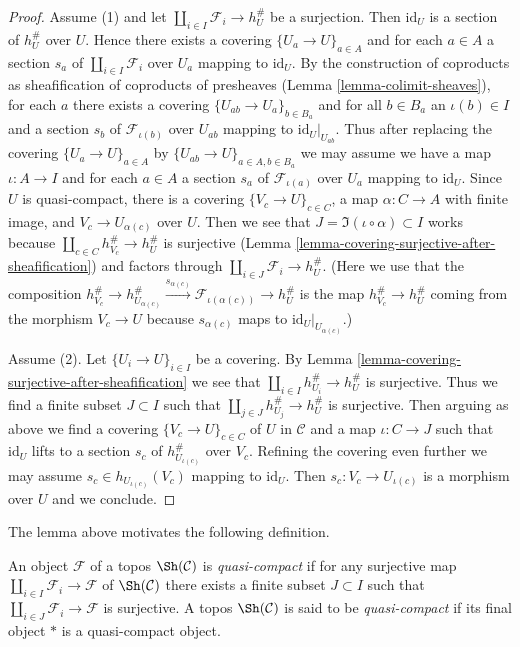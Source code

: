 \begin{proof}
Assume (1) and let $\coprod_{i \in I} \mathcal{F}_i \to h_U^\#$
be a surjection. Then $\text{id}_U$ is a section of
$h_U^\#$ over $U$. Hence there exists a covering
$\{U_a \to U\}_{a \in A}$ and for each $a \in A$
a section $s_a$ of $\coprod_{i \in I} \mathcal{F}_i$
over $U_a$ mapping to $\text{id}_U$. By the construction of coproducts as
sheafification of coproducts of presheaves
(Lemma \ref{lemma-colimit-sheaves}), for each $a$
there exists a covering $\{U_{ab} \to U_a\}_{b \in B_a}$ and
for all $b \in B_a$ an $\iota(b) \in I$ and a section
$s_{b}$ of $\mathcal{F}_{\iota(b)}$ over $U_{ab}$
mapping to $\text{id}_U|_{U_{ab}}$. Thus after replacing
the covering $\{U_a \to U\}_{a \in A}$ by
$\{U_{ab} \to U\}_{a \in A, b \in B_a}$
we may assume we have a map $\iota : A \to I$
and for each $a \in A$ a section $s_a$ of $\mathcal{F}_{\iota(a)}$
over $U_a$ mapping to $\text{id}_U$.
Since $U$ is quasi-compact, there is a covering
$\{V_c \to U\}_{c \in C}$, a map $\alpha : C \to A$
with finite image, and $V_c \to U_{\alpha(c)}$ over $U$.
Then we see that $J = \Im(\iota \circ \alpha) \subset I$ works
because $\coprod_{c \in C} h_{V_c}^\# \to h_U^\#$ is surjective
(Lemma \ref{lemma-covering-surjective-after-sheafification})
and factors through $\coprod_{i \in J} \mathcal{F}_i \to h_U^\#$.
(Here we use that the composition
$h_{V_c}^\# \to h_{U_{\alpha(c)}}^\#
\xrightarrow{s_{\alpha(c)}} \mathcal{F}_{\iota(\alpha(c))} \to h_U^\#$
is the map $h_{V_c}^\# \to h_U^\#$ coming from the morphism
$V_c \to U$ because $s_{\alpha(c)}$ maps to $\text{id}_U|_{U_{\alpha(c)}}$.)

\medskip\noindent
Assume (2). Let $\{U_i \to U\}_{i \in I}$ be a covering.
By Lemma \ref{lemma-covering-surjective-after-sheafification}
we see that $\coprod_{i \in I} h_{U_i}^\# \to h_U^\#$ is surjective.
Thus we find a finite subset $J \subset I$ such that
$\coprod_{j \in J} h_{U_j}^\# \to h_U^\#$ is surjective.
Then arguing as above we find a covering
$\{V_c \to U\}_{c \in C}$ of $U$ in $\mathcal{C}$
and a map $\iota : C \to J$
such that $\text{id}_U$ lifts to a section
$s_c$ of $h_{U_{\iota(c)}}^\#$ over $V_c$.
Refining the covering even further we may assume
$s_c \in h_{U_{\iota(c)}}(V_c)$ mapping to $\text{id}_U$.
Then $s_c : V_c \to U_{\iota(c)}$ is a morphism over $U$
and we conclude.
\end{proof}

\noindent
The lemma above motivates the following definition.

\begin{definition}
\label{definition-quasi-compact-topos}
An object $\mathcal{F}$ of a topos $\Sh(\mathcal{C})$ is {\it quasi-compact}
if for any surjective map $\coprod_{i \in I} \mathcal{F}_i \to \mathcal{F}$
of $\Sh(\mathcal{C})$ there exists a finite subset $J \subset I$ such
that $\coprod_{i \in J} \mathcal{F}_i \to \mathcal{F}$ is surjective.
A topos $\Sh(\mathcal{C})$ is said to be {\it quasi-compact}
if its final object $*$ is a quasi-compact object.
\end{definition}

